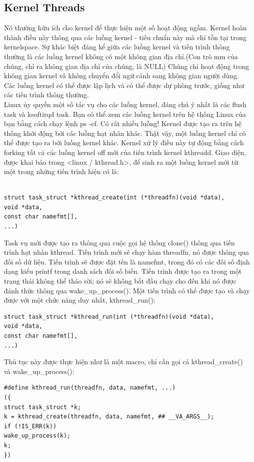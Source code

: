 \documentclass[a4paper,10pt]{report}
\begin{document}
\subsection{Kernel Threads}
Nó thường hữu ích cho kernel để thực hiện một số hoạt động ngầm. Kernel hoàn thành điều này thông qua các luồng kernel - tiêu chuẩn này mà chỉ tồn tại trong kernelspace. Sự khác biệt đáng kể giữa các luồng kernel và tiến trình thông thường là các luồng kernel không có một không gian địa chỉ.(Con trỏ mm của chúng, chỉ ra không gian địa chỉ của chúng, là NULL) Chúng chỉ hoạt động trong không gian kernel và không chuyển đổi ngữ cảnh sang không gian người dùng. Các luồng kernel có thể được lập lịch và có thể được dự phòng trước, giống như các tiến trình thông thường. \\

Linux ủy quyền một số tác vụ cho các luồng kernel, đáng chú ý nhất là các flush task và ksoftirqd task. Bạn có thể xem các luồng kernel trên hệ thống Linux của bạn bằng cách chạy lệnh ps -ef. Có rất nhiều luồng! Kernel được tạo ra trên hệ thống khởi động bởi các luồng hạt nhân khác. Thật vậy, một luồng kernel chỉ có thể được tạo ra bởi luồng kernel khác. Kernel xử lý điều này tự động bằng cách forking tất cả các luồng kernel off mới của tiến trình kernel kthreadd. Giao diện, được khai báo trong <linux / kthread.h>, để sinh ra một luồng kernel mới từ một trong những tiến trình hiện có là: \\ \\
\begin{lstlisting}
struct task_struct *kthread_create(int (*threadfn)(void *data),
void *data,
const char namefmt[],
...)
\end{lstlisting}


Task vụ mới được tạo ra thông qua cuộc gọi hệ thống clone() thông qua tiến trình hạt nhân kthread. Tiến trình mới sẽ chạy hàm threadfn, nó được thông qua đối số dữ liệu. Tiến trình sẽ được đặt tên là namefmt, trong đó có các đối số định dạng kiểu printf trong danh sách đối số biến. Tiến trình được tạo ra trong một trạng thái không thể tháo rời; nó sẽ không bắt đầu chạy cho đến khi nó được đánh thức thông qua wake\_up\_process(). Một tiến trình có thể được tạo và chạy được với một chức năng duy nhất, kthread\_run(): \\
\begin{lstlisting}
struct task_struct *kthread_run(int (*threadfn)(void *data),
void *data,
const char namefmt[],
...)
\end{lstlisting}
Thủ tục này được thực hiện như là một macro, chỉ cần gọi cả kthread\_create() và wake\_up\_process(): \\
\begin{lstlisting}
#define kthread_run(threadfn, data, namefmt, ...) 
({ 
struct task_struct *k; 
k = kthread_create(threadfn, data, namefmt, ## __VA_ARGS__); 
if (!IS_ERR(k)) 
wake_up_process(k); 
k; 
})
\end{lstlisting}
\end{document}

